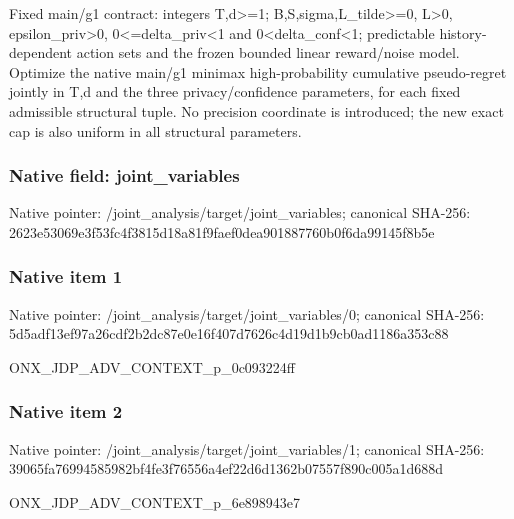 \documentclass[10pt,a4paper]{article}
\begin{document}
\begingroup\raggedright\sloppy Fixed main/\allowbreak{}g1 contract:\allowbreak{} integers T,\allowbreak{}d>=\allowbreak{}1;\allowbreak{} B,\allowbreak{}S,\allowbreak{}sigma,\allowbreak{}L\_\allowbreak{}tilde>=\allowbreak{}0,\allowbreak{} L>0,\allowbreak{} epsilon\_\allowbreak{}priv>0,\allowbreak{} 0<=\allowbreak{}delta\_\allowbreak{}priv<1 and 0<delta\_\allowbreak{}conf<1;\allowbreak{} predictable history-dependent action sets and the frozen bounded linear reward/\allowbreak{}noise model. Optimize the native main/\allowbreak{}g1 minimax high-probability cumulative pseudo-regret jointly in T,\allowbreak{}d and the three privacy/\allowbreak{}confidence parameters,\allowbreak{} for each fixed admissible structural tuple. No precision coordinate is introduced;\allowbreak{} the new exact cap is also uniform in all structural parameters.\par\endgroup

\subsubsection{Native field: joint\_\allowbreak{}variables}
Native pointer: /joint\_\allowbreak{}analysis/target/joint\_\allowbreak{}variables; canonical SHA-256: 2623e53069e3f53fc4f3815d18a81f9faef0dea901887760b0f6da99145f8b5e

\subsubsection{Native item 1}
Native pointer: /joint\_\allowbreak{}analysis/target/joint\_\allowbreak{}variables/0; canonical SHA-256: 5d5adf13ef97a26cdf2b2dc87e0e16f407d7626c4d19d1b9cb0ad1186a353c88

\begingroup\raggedright\sloppy ONX\_\allowbreak{}JDP\_\allowbreak{}ADV\_\allowbreak{}CONTEXT\_\allowbreak{}p\_\allowbreak{}0c093224ff\par\endgroup

\subsubsection{Native item 2}
Native pointer: /joint\_\allowbreak{}analysis/target/joint\_\allowbreak{}variables/1; canonical SHA-256: 39065fa76994585982bf4fe3f76556a4ef22d6d1362b07557f890c005a1d688d

\begingroup\raggedright\sloppy ONX\_\allowbreak{}JDP\_\allowbreak{}ADV\_\allowbreak{}CONTEXT\_\allowbreak{}p\_\allowbreak{}6e898943e7\par\endgroup
\end{document}
